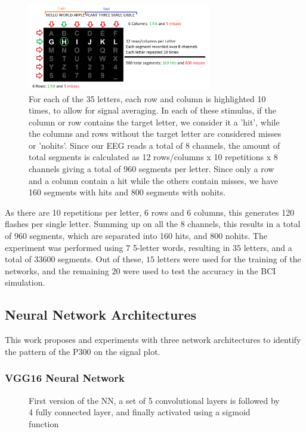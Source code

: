 \documentclass[conference]{IEEEtran}
\begin{document}
\begin{figure}[htbp]
\centerline{\includegraphics[width=8cm, keepaspectratio]{images/experiment.png}}
\caption[Experimental protocol visualization]{For each of the 35 letters, each row and column is highlighted 10 times, to allow for signal averaging. In each of these stimulus, if the column or row contains the target letter, we consider it a 'hit', while the columns and rows without the target letter are considered misses or 'nohits'. Since our EEG reads a total of 8 channels, the amount of total segments is calculated as 12 rows/columns x 10 repetitions x 8 channels  giving a total of 960 segments per letter. Since only a row and a column contain a hit while the others contain misses, we have 160 segments with hits and 800 segments with nohits.}
\label{fig:datastructure}
\end{figure}

As there are 10 repetitions per letter, 6 rows and 6 columns, this generates 120 flashes per single letter.  Summing up on all the $8$ channels, this results in a total of 960 segments, which are separated into 160 hits, and 800 nohits.  The experiment was performed using $7$ 5-letter words, resulting in $35$ letters, and a total of $33600$ segments. Out of these, $15$ letters were used for the training of the networks, and the remaining $20$ were used to test the accuracy in the BCI simulation.


\subsection{Neural Network Architectures}

This work proposes and experiments with three network architectures to identify the pattern of the P300 on the signal plot.

\subsubsection{VGG16 Neural Network}

\begin{figure}[!t]

\caption[VGG16 Neural Network]{First version of the NN, a set of 5 convolutional layers is followed by 4 fully connected layer, and finally activated using a sigmoid function}
\label{fig:nnv1}
\end{figure}
\end{document}
